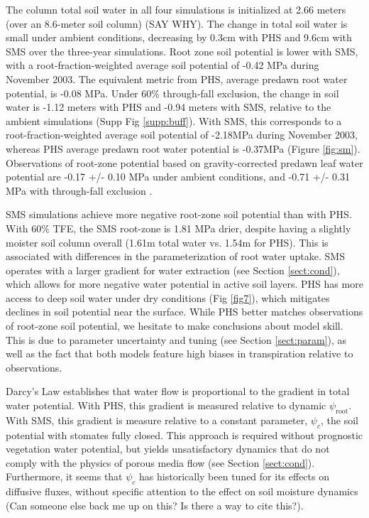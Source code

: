 \documentclass[draft,linenumbers]{agujournal}
\begin{document}
    The column total soil water in all four simulations is initialized at 2.66 meters (over an 8.6-meter soil column) (SAY WHY).
    The change in total soil water is small under ambient conditions, decreasing by 0.3cm with PHS and 9.6cm with SMS over the three-year simulations.
    Root zone soil potential is lower with SMS, with a root-fraction-weighted average soil potential of -0.42 MPa during November 2003.
    The equivalent metric from PHS, average predawn root water potential, is -0.08 MPa.
    Under 60\% through-fall exclusion, the change in soil water is -1.12 meters with PHS and -0.94 meters with SMS, relative to the ambient simulations (Supp Fig \ref{supp:buff}).
    With SMS, this corresponds to a root-fraction-weighted average soil potential of -2.18MPa during November 2003, whereas 
    PHS average predawn root water potential is -0.37MPa (Figure \ref{fig:sm}).
    Observations of root-zone potential based on gravity-corrected predawn leaf water potential are -0.17 +/- 0.10 MPa under ambient conditions, and -0.71 +/- 0.31 MPa with through-fall exclusion \citep{fisher2007}.
    
    SMS simulations achieve more negative root-zone soil potential than with PHS.
    With 60\% TFE, the SMS root-zone is 1.81 MPa drier, despite having a slightly moister soil column overall (1.61m total water vs. 1.54m for PHS).
    This is associated with differences in the parameterization of root water uptake.
    SMS operates with a larger gradient for water extraction (see Section \ref{sect:cond}), which allows for more negative water potential in active soil layers.
    PHS has more access to deep soil water under dry conditions (Fig \ref{fig7}), which mitigates declines in soil potential near the surface.
    While PHS better matches observations of root-zone soil potential, we hesitate to make conclusions about model skill.
    This is due to parameter uncertainty and tuning (see Section \ref{sect:param}), as well as the fact that both models feature high biases in transpiration relative to observations.
    
    Darcy's Law establishes that water flow is proportional to the gradient in total water potential. 
    With PHS, this gradient is measured relative to dynamic $\psi_{\text{root}}$.
    With SMS, this gradient is measure relative to a constant parameter, $\psi_c$, the soil potential with stomates fully closed.
    This approach is required without prognostic vegetation water potential, but yields unsatisfactory dynamics that do not comply with the physics of porous media flow (see Section \ref{sect:cond}).
    Furthermore, it seems that $\psi_c$ has historically been tuned for its effects on diffusive fluxes, without specific attention to the effect on soil moisture dynamics 
    (Can someone else back me up on this? Is there a way to cite this?).
    
\end{document}

